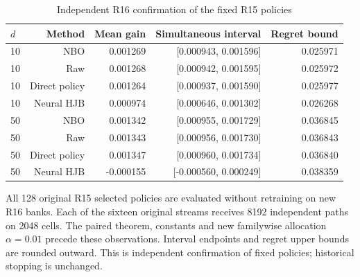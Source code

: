 \begin{table}[!htbp]
\centering\small
\caption{Independent R16 confirmation of the fixed R15 policies}
\label{tab:r16-replication-methods}
\begin{tabular}{lrrrr}
\toprule
$d$ & Method & Mean gain & Simultaneous interval & Regret bound \\
\midrule
10 & NBO & 0.001269 & [0.000943, 0.001596] & 0.025971 \\
10 & Raw & 0.001268 & [0.000942, 0.001595] & 0.025972 \\
10 & Direct policy & 0.001264 & [0.000937, 0.001590] & 0.025977 \\
10 & Neural HJB & 0.000974 & [0.000646, 0.001302] & 0.026268 \\
50 & NBO & 0.001342 & [0.000955, 0.001729] & 0.036845 \\
50 & Raw & 0.001343 & [0.000956, 0.001730] & 0.036843 \\
50 & Direct policy & 0.001347 & [0.000960, 0.001734] & 0.036840 \\
50 & Neural HJB & -0.000155 & [-0.000560, 0.000249] & 0.038359 \\
\bottomrule
\end{tabular}
\par\medskip\noindent\footnotesize All 128 original R15 selected policies are evaluated without retraining on new R16 banks. Each of the sixteen original streams receives 8192 independent paths on 2048 cells. The paired theorem, constants and new familywise allocation $\alpha=0.01$ precede these observations. Interval endpoints and regret upper bounds are rounded outward. This is independent confirmation of fixed policies; historical stopping is unchanged.
\end{table}
